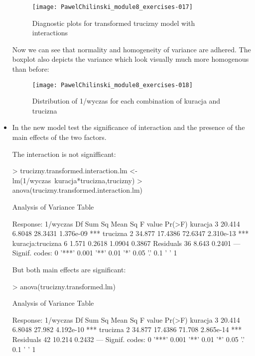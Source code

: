 \documentclass[a4paper]{article}
\begin{document}
\begin{itemize}
\begin{figure}[H]
\begin{center}
\texttt{[image: PawelChilinski\_module8\_exercises-017]}
\caption{Diagnostic plots for transformed trucizny model with interactions}
\end{center}
\end{figure}
Now we can see that normality and homogeneity of variance are adhered.
The boxplot also depicts the variance which look visually much more homogenous
than before: 
\begin{figure}[H]
\begin{center}
\texttt{[image: PawelChilinski\_module8\_exercises-018]}
\caption{Distribution of 1/wyczas for each combination of kuracja and trucizna}
\end{center}
\end{figure}

\item In the new model test the significance of interaction and the presence of
the main effects of the two factors.

The interaction is not signifficant:
\begin{Schunk}
\begin{Sinput}
> trucizny.transformed.interaction.lm <- lm(1/wyczas~kuracja*trucizna,trucizny)	
> anova(trucizny.transformed.interaction.lm)	
\end{Sinput}
\begin{Soutput}
Analysis of Variance Table

Response: 1/wyczas
                 Df Sum Sq Mean Sq F value    Pr(>F)    
kuracja           3 20.414  6.8048 28.3431 1.376e-09 ***
trucizna          2 34.877 17.4386 72.6347 2.310e-13 ***
kuracja:trucizna  6  1.571  0.2618  1.0904    0.3867    
Residuals        36  8.643  0.2401                      
---
Signif. codes:  0 '***' 0.001 '**' 0.01 '*' 0.05 '.' 0.1 ' ' 1
\end{Soutput}
\end{Schunk}
But both main effects are significant:
\begin{Schunk}
\begin{Sinput}
> anova(trucizny.transformed.lm)		
\end{Sinput}
\begin{Soutput}
Analysis of Variance Table

Response: 1/wyczas
          Df Sum Sq Mean Sq F value    Pr(>F)    
kuracja    3 20.414  6.8048  27.982 4.192e-10 ***
trucizna   2 34.877 17.4386  71.708 2.865e-14 ***
Residuals 42 10.214  0.2432                      
---
Signif. codes:  0 '***' 0.001 '**' 0.01 '*' 0.05 '.' 0.1 ' ' 1
\end{Soutput}
\end{Schunk}


\end{itemize}
\end{document}
